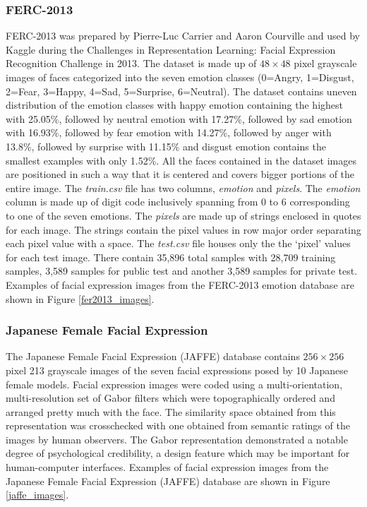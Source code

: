 \documentclass[master]{thesis-uestc}
\begin{document}
\subsubsection{FERC-2013}
FERC-2013 was prepared by Pierre-Luc Carrier and Aaron Courville and used by Kaggle during the Challenges in Representation Learning: Facial Expression Recognition Challenge in 2013. The dataset is made up of $48\times48$ pixel grayscale images of faces categorized into the seven emotion classes (0=Angry, 1=Disgust, 2=Fear, 3=Happy, 4=Sad, 5=Surprise, 6=Neutral). The dataset contains uneven distribution of the emotion classes with happy emotion containing the highest with 25.05\%, followed by neutral emotion with 17.27\%, followed by sad emotion with 16.93\%, followed by fear emotion with 14.27\%, followed by anger with 13.8\%, followed by surprise with 11.15\% and disgust emotion contains the smallest examples with only 1.52\%.  All the faces contained in the dataset images are positioned in such a way that it is centered and covers bigger portions of the entire image. The \textit{train.csv} file has two columns, \textit{emotion} and \textit{pixels}. The \textit{emotion} column is made up of digit code inclusively spanning from 0 to 6 corresponding to one of the seven emotions. The \textit{pixels} are made up of strings enclosed in quotes for each image. The strings contain the pixel values in row major order separating each pixel value with a space. The \textit{test.csv} file houses only the the `pixel' values for each test image. There contain 35,896 total samples with 28,709 training samples, 3,589 samples for public test and another 3,589 samples for private test.  Examples of facial expression images from the FERC-2013 emotion database are shown in Figure \ref{fer2013_images}.

\subsubsection{Japanese Female Facial Expression}
The Japanese Female Facial Expression (JAFFE) database contains $256\times256$ pixel 213 grayscale images of the seven facial expressions posed by 10 Japanese female models. Facial expression images were coded using a multi-orientation, multi-resolution set of Gabor filters which were topographically ordered and arranged pretty much with the face. The similarity space
obtained from this representation was crosschecked with one obtained from semantic ratings of the images by human observers. The Gabor representation demonstrated a notable degree of psychological credibility, a design feature which may be important for human-computer interfaces. Examples of facial expression images from the Japanese Female Facial Expression (JAFFE) database are shown in Figure \ref{jaffe_images}.
\end{document}
